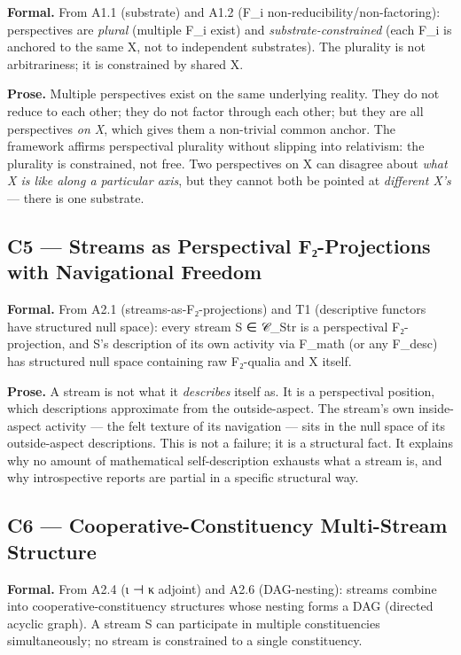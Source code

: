 \documentclass[11pt, openany]{book}
\begin{document}
\textbf{Formal.} From A1.1 (substrate) and A1.2 (F\_\allowbreak{}i non-reducibility/non-factoring): perspectives are \textit{plural} (multiple F\_\allowbreak{}i exist) and \textit{substrate-constrained} (each F\_\allowbreak{}i is anchored to the same X, not to independent substrates). The plurality is not arbitrariness; it is constrained by shared X.

\textbf{Prose.} Multiple perspectives exist on the same underlying reality. They do not reduce to each other; they do not factor through each other; but they are all perspectives \textit{on X}, which gives them a non-trivial common anchor. The framework affirms perspectival plurality without slipping into relativism: the plurality is constrained, not free. Two perspectives on X can disagree about \textit{what X is like along a particular axis}, but they cannot both be pointed at \textit{different X's} --- there is one substrate.

\subsection{C5 --- Streams as Perspectival F₂-Projections with Navigational Freedom}

\textbf{Formal.} From A2.1 (streams-as-F₂-projections) and T1 (descriptive functors have structured null space): every stream S ∈ 𝒞\_\allowbreak{}Str is a perspectival F₂-projection, and S's description of its own activity via F\_\allowbreak{}math (or any F\_\allowbreak{}desc) has structured null space containing raw F₂-qualia and X itself.

\textbf{Prose.} A stream is not what it \textit{describes} itself as. It is a perspectival position, which descriptions approximate from the outside-aspect. The stream's own inside-aspect activity --- the felt texture of its navigation --- sits in the null space of its outside-aspect descriptions. This is not a failure; it is a structural fact. It explains why no amount of mathematical self-description exhausts what a stream is, and why introspective reports are partial in a specific structural way.

\subsection{C6 --- Cooperative-Constituency Multi-Stream Structure}

\textbf{Formal.} From A2.4 (ι ⊣ κ adjoint) and A2.6 (DAG-nesting): streams combine into cooperative-constituency structures whose nesting forms a DAG (directed acyclic graph). A stream S can participate in multiple constituencies simultaneously; no stream is constrained to a single constituency.
\end{document}
